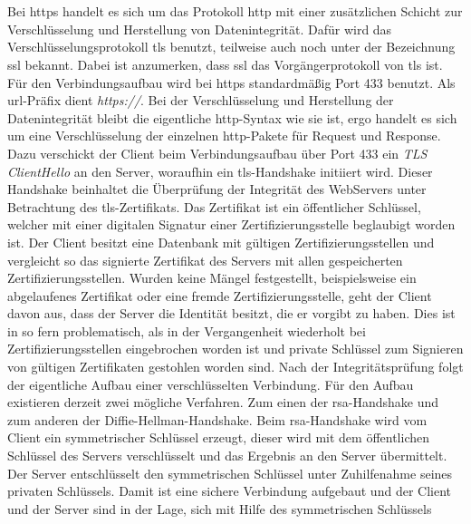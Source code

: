 \documentclass[titlepage]{report}
\begin{document}
\section{}
Bei \gls{https} handelt es sich um das Protokoll \gls{http} mit einer
zusätzlichen Schicht zur Verschlüsselung und Herstellung von
Datenintegrität. Dafür wird das Verschlüsselungsprotokoll \gls{tls}
benutzt, teilweise auch noch unter der Bezeichnung \gls{ssl} bekannt.
Dabei ist anzumerken, dass \gls{ssl} das Vorgängerprotokoll von
\gls{tls} ist.
Für den Verbindungsaufbau wird bei \gls{https} standardmäßig
Port 433 benutzt\cite[Siehe Section 2.3]{RFC2818}. Als
\gls{url}\hyp{}Präfix dient \emph{https://}. Bei der Verschlüsselung und
Herstellung der Datenintegrität bleibt die eigentliche
\gls{http}\hyp{}Syntax wie sie ist, ergo handelt es sich um eine Verschlüsselung der
einzelnen \gls{http}\hyp{}Pakete für Request und Response. Dazu verschickt der Client beim
Verbindungsaufbau über Port 433 ein \emph{TLS ClientHello} an den
Server, woraufhin ein \gls{tls}\hyp{}Handshake initiiert wird.
Dieser Handshake beinhaltet die Überprüfung der Integrität des WebServers
unter Betrachtung des \gls{tls}\hyp{}Zertifikats. Das Zertifikat ist
ein öffentlicher Schlüssel, welcher mit einer
digitalen Signatur einer Zertifizierungsstelle beglaubigt worden ist.
Der Client besitzt eine Datenbank mit gültigen Zertifizierungsstellen
und vergleicht so das signierte Zertifikat des Servers mit allen
gespeicherten Zertifizierungsstellen. Wurden keine Mängel
festgestellt, beispielsweise ein abgelaufenes Zertifikat oder eine
fremde Zertifizierungsstelle, geht der Client davon aus, dass der Server
die Identität besitzt, die er vorgibt zu haben. Dies ist in so fern
problematisch, als in der Vergangenheit wiederholt bei
Zertifizierungsstellen eingebrochen worden ist und private Schlüssel zum
Signieren von gültigen Zertifikaten gestohlen worden
sind\cite{PRIVATEKEYSSTOLEN}. Nach der Integritätsprüfung folgt der
eigentliche Aufbau einer verschlüsselten Verbindung. Für den Aufbau
existieren derzeit zwei mögliche Verfahren. Zum einen der
\gls{rsa}\hyp{}Handshake und zum anderen der
Diffie\hyp{}Hellman\hyp{}Handshake\cite{TLS}. Beim
\gls{rsa}\hyp{}Handshake wird vom Client ein symmetrischer Schlüssel
erzeugt, dieser wird mit dem öffentlichen Schlüssel des Servers
verschlüsselt und das Ergebnis an den Server übermittelt. Der Server entschlüsselt den
symmetrischen Schlüssel unter Zuhilfenahme seines privaten Schlüssels.
Damit ist eine sichere Verbindung aufgebaut und der Client und der Server
sind in der Lage, sich mit Hilfe des symmetrischen Schlüssels
\end{document}
